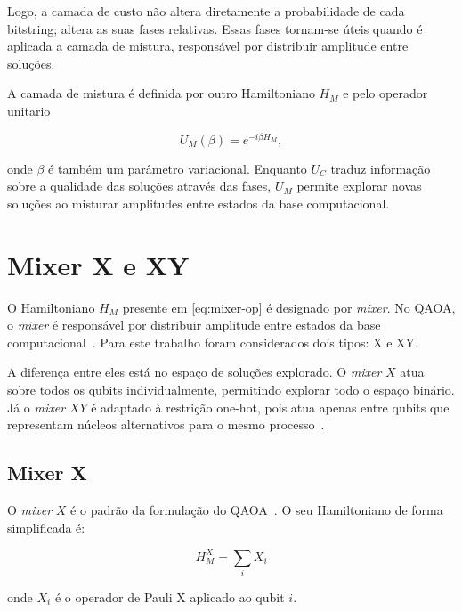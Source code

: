Logo, a camada de custo não altera diretamente a probabilidade de cada bitstring; altera as suas fases relativas. Essas fases tornam-se úteis quando é aplicada a camada de mistura, responsável por distribuir amplitude entre soluções.

A camada de mistura é definida por outro Hamiltoniano $H_M$ e pelo operador unitario

\begin{equation}
\label{eq:mixer-op}
    U_M(\beta) = e^{-i\beta H_M},
\end{equation}

onde $\beta$ é também um parâmetro variacional. Enquanto $U_C$ traduz informação
sobre a qualidade das soluções através das fases, $U_M$ permite explorar novas
soluções ao misturar amplitudes entre estados da base computacional.

\section{Mixer X e XY}
\label{sec:mixer-x-xy}

O Hamiltoniano $H_M$ presente em \eqref{eq:mixer-op} é designado por \textit{mixer}. No \acs{QAOA}, o \textit{mixer} é responsável por distribuir amplitude entre estados da base computacional~\cite{Farhi2014QAOA,Hadfield2017AlternatingOperator}. Para este trabalho foram considerados dois tipos: X e XY.

A diferença entre eles está no espaço de soluções explorado. O \textit{mixer} $X$ atua sobre todos os qubits individualmente, permitindo explorar todo o espaço binário. Já o \textit{mixer} $XY$ é adaptado à restrição one-hot, pois atua apenas entre qubits que representam núcleos alternativos para o mesmo processo~\cite{Wang2019XYMixers,Fuchs2022ConstrainedMixers}.

\subsection{Mixer X}
\label{subsec:mixer-x}

O \textit{mixer} $X$ é o padrão da formulação do \acs{QAOA}~\cite{Farhi2014QAOA}. O seu Hamiltoniano de forma simplificada é:

\begin{equation}
    H_M^X=\sum_i X_i
\end{equation}

onde $X_i$ é o operador de Pauli X aplicado ao qubit $i$.


